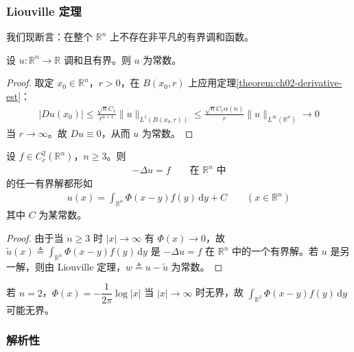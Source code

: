 \documentclass[../../main.tex]{subfiles}
\begin{document}
\subsubsection{Liouville 定理}

我们现断言：在整个 $\mathbb{R}^n$ 上不存在非平凡的有界调和函数。

\begin{theorem}[Liouville 定理]\label{theorem:ch02-liouville}设 $u:\mathbb{R}^n\to\mathbb{R}$ 调和且有界。则 $u$ 为常数。
\end{theorem}

\begin{proof}
取定 $x_0\in\mathbb{R}^n$，$r>0$，在 $B(x_0,r)$ 上应用定理\cref{theorem:ch02-derivative-est}：
\begin{align*}
|Du(x_0)|\leqslant\frac{\sqrt{n}C_1}{r^{n+1}}\|u\|_{L^1(B(x_0,r))}
\leqslant\frac{\sqrt{n}C_1\alpha(n)}{r}\|u\|_{L^\infty(\mathbb{R}^n)}\to 0
\end{align*}
当 $r\to\infty$。故 $Du\equiv 0$，从而 $u$ 为常数。
\end{proof}

\begin{theorem}[表示公式]\label{theorem:ch02-rep-formula}设 $f\in C_c^2(\mathbb{R}^n)$，$n\geqslant 3$。则
\begin{align*}
-\Delta u=f \qquad \text{在 }\mathbb{R}^n\text{ 中}
\end{align*}
的任一有界解都形如
\begin{align*}
u(x)=\int_{\mathbb{R}^n}\Phi(x-y)f(y)\,\mathrm{d}y+C \qquad (x\in\mathbb{R}^n)
\end{align*}
其中 $C$ 为某常数。
\end{theorem}

\begin{proof}
由于当 $n\geqslant 3$ 时 $|x|\to\infty$ 有 $\Phi(x)\to 0$，故 $\widetilde{u}(x)\triangleq\int_{\mathbb{R}^n}\Phi(x-y)f(y)\,\mathrm{d}y$ 是 $-\Delta u=f$ 在 $\mathbb{R}^n$ 中的一个有界解。若 $u$ 是另一解，则由 Liouville 定理，$w\triangleq u-\widetilde{u}$ 为常数。
\end{proof}

\begin{remark}\label{remark:ch02-n2}
若 $n=2$，$\Phi(x)=-\dfrac{1}{2\pi}\log|x|$ 当 $|x|\to\infty$ 时无界，故 $\int_{\mathbb{R}^2}\Phi(x-y)f(y)\,\mathrm{d}y$ 可能无界。
\end{remark}

\subsubsection{解析性}
\end{document}

